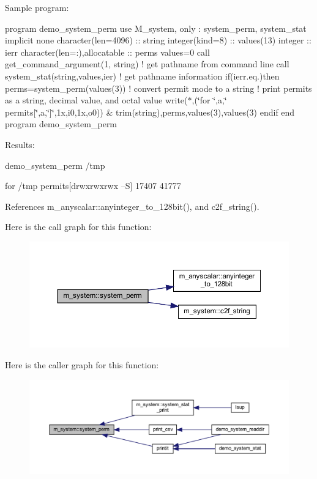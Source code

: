 Sample program\+:

program demo\+\_\+system\+\_\+perm use M\+\_\+system, only \+: system\+\_\+perm, system\+\_\+stat implicit none character(len=4096) \+:\+: string integer(kind=8) \+:\+: values(13) integer \+:\+: ierr character(len=\+:),allocatable \+:\+: perms values=0 call get\+\_\+command\+\_\+argument(1, string) ! get pathname from command line call system\+\_\+stat(string,values,ier) ! get pathname information if(ierr.\+eq.)then perms=system\+\_\+perm(values(3)) ! convert permit mode to a string ! print permits as a string, decimal value, and octal value write($\ast$,\textquotesingle{}(\char`\"{}for \char`\"{},a,\char`\"{} permits\mbox{[}\char`\"{},a,\char`\"{}\mbox{]}\char`\"{},1x,i0,1x,o0)\textquotesingle{}) \& trim(string),perms,values(3),values(3) endif end program demo\+\_\+system\+\_\+perm

Results\+:

demo\+\_\+system\+\_\+perm /tmp

for /tmp permits\mbox{[}drwxrwxrwx --S\mbox{]} 17407 41777 

References m\+\_\+anyscalar\+::anyinteger\+\_\+to\+\_\+128bit(), and c2f\+\_\+string().

Here is the call graph for this function\+:
\nopagebreak
\begin{figure}[H]
\begin{center}
\leavevmode
\includegraphics[width=350pt]{namespacem__system_ae8f39e1d4e420396319105e4e81f92b5_cgraph}
\end{center}
\end{figure}
Here is the caller graph for this function\+:
\nopagebreak
\begin{figure}[H]
\begin{center}
\leavevmode
\includegraphics[width=350pt]{namespacem__system_ae8f39e1d4e420396319105e4e81f92b5_icgraph}
\end{center}
\end{figure}
\mbox{\label{namespacem__system_afae451a1fc5432274dc1f75a364051b4}} 
